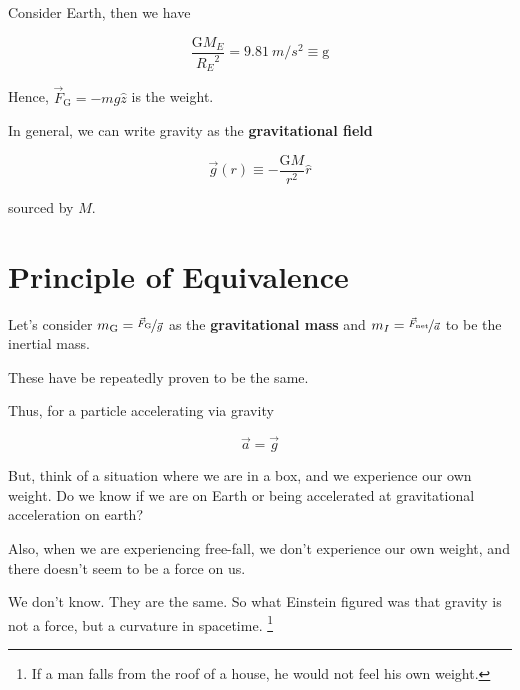Consider Earth, then we have

\begin{equation}
	\frac{\mathrm{G} M_E}{{R_E}^2} = \SI{9.81}{m/s^2} \equiv \mathrm{g}
\end{equation}

Hence, $\vec F_\mathrm{G} = - mg\hat z$ is the weight.

In general, we can write gravity as the \textbf{gravitational field}

\begin{equation}
	\vec{g} (r) \equiv - \frac{\mathrm{G} M}{r^2} \hat r
\end{equation}

sourced by $M$.

\section{Principle of Equivalence}

Let's consider $m_\mathrm{G} = \nicefrac{\vec F_\mathrm{G}}{\vec g}$ as the \textbf{gravitational mass} and $m_I = \nicefrac{\vec F_\mathrm{net}}{\vec a}$ to be the inertial mass.

These have be repeatedly proven to be the same.

Thus, for a particle accelerating via gravity

\begin{equation}
	\vec a = \vec g
\end{equation}

\begin{remark}
	But, think of a situation where we are in a box, and we experience our own weight. Do we know if we are on Earth or being accelerated at gravitational acceleration on earth?

	Also, when we are experiencing free-fall, we don't experience our own weight, and there doesn't seem to be a force on us.

	We don't know. They are the same. So what Einstein figured was that gravity is not a force, but a curvature in spacetime. \footnote{If a man falls from the roof of a house, he would not feel his own weight.}
\end{remark}
